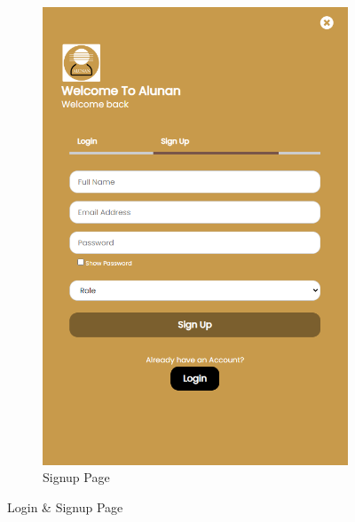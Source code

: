 \begin{enumerate}[1.]
\begin{figure}[h]
\begin{subfigure}[b]{0.4\textwidth}
            \includegraphics[width=\textwidth]{mainmatter/images/frontend/ss/Login-Signup2.png}
            \caption{Signup Page}
            \label{fig:sub2}
        \end{subfigure}
        \caption{Login \& Signup Page}
        \label{fig:myfig49}
    \end{figure}
    \begin{figure}[h]\ContinuedFloat
        \centering
        \begin{subfigure}[b]{0.7\textwidth}
            \centering

\end{subfigure}
\end{figure}
\end{enumerate}
